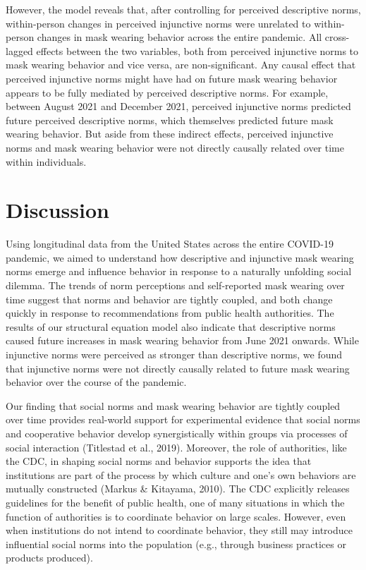\documentclass[
  english,
  man,floatsintext]{apa6}
\begin{document}
However, the model reveals that, after controlling for perceived descriptive norms, within-person changes in perceived injunctive norms were unrelated to within-person changes in mask wearing behavior across the entire pandemic. All cross-lagged effects between the two variables, both from perceived injunctive norms to mask wearing behavior and vice versa, are non-significant. Any causal effect that perceived injunctive norms might have had on future mask wearing behavior appears to be fully mediated by perceived descriptive norms. For example, between August 2021 and December 2021, perceived injunctive norms predicted future perceived descriptive norms, which themselves predicted future mask wearing behavior. But aside from these indirect effects, perceived injunctive norms and mask wearing behavior were not directly causally related over time within individuals.

\hypertarget{discussion}{%
\section{Discussion}\label{discussion}}

Using longitudinal data from the United States across the entire COVID-19 pandemic, we aimed to understand how descriptive and injunctive mask wearing norms emerge and influence behavior in response to a naturally unfolding social dilemma. The trends of norm perceptions and self-reported mask wearing over time suggest that norms and behavior are tightly coupled, and both change quickly in response to recommendations from public health authorities. The results of our structural equation model also indicate that descriptive norms caused future increases in mask wearing behavior from June 2021 onwards. While injunctive norms were perceived as stronger than descriptive norms, we found that injunctive norms were not directly causally related to future mask wearing behavior over the course of the pandemic.

Our finding that social norms and mask wearing behavior are tightly coupled over time provides real-world support for experimental evidence that social norms and cooperative behavior develop synergistically within groups via processes of social interaction (Titlestad et al., 2019). Moreover, the role of authorities, like the CDC, in shaping social norms and behavior supports the idea that institutions are part of the process by which culture and one's own behaviors are mutually constructed (Markus \& Kitayama, 2010). The CDC explicitly releases guidelines for the benefit of public health, one of many situations in which the function of authorities is to coordinate behavior on large scales. However, even when institutions do not intend to coordinate behavior, they still may introduce influential social norms into the population (e.g., through business practices or products produced).
\end{document}
